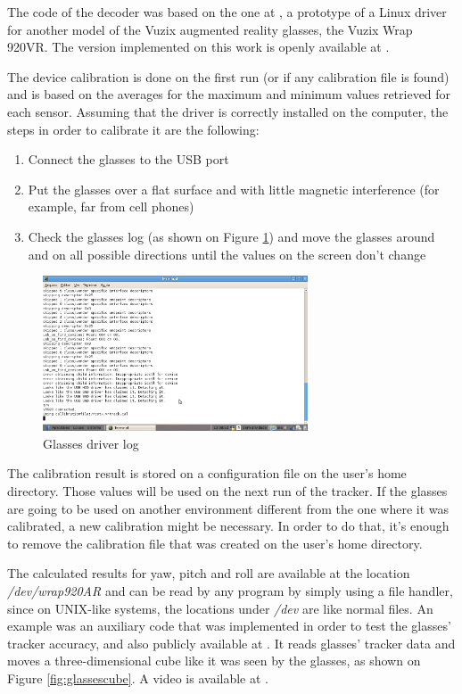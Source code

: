 \documentclass[msc, a4paper, classic, en]{ufbathesis}
\begin{document}
The code of the decoder was based on the one at \cite{vuzixdriver}, a prototype of a Linux driver for another model of the Vuzix augmented reality glasses, the Vuzix Wrap 920VR. The version implemented on this work is openly available at \cite{masterproject}.

The device calibration is done on the first run (or if any calibration file is found) and is based on the averages for the maximum and minimum values retrieved for each sensor. Assuming that the driver is correctly installed on the computer, the steps in order to calibrate it are the following:

\begin{enumerate}
  \item Connect the glasses to the USB port
  \item Put the glasses over a flat surface and with little magnetic interference (for example, far from cell phones)
  \item Check the glasses log (as shown on Figure \ref{fig:glasseslog}) and move the glasses around and on all possible directions until the values on the screen don't change
\end{enumerate}

\begin{figure}
\centering
\includegraphics[width=0.7\textwidth]{images/glasseslog.png}
\caption{Glasses driver log}
\label{fig:glasseslog}
\end{figure}

The calibration result is stored on a configuration file on the user's home directory. Those values will be used on the next run of the tracker. If the glasses are going to be used on another environment different from the one where it was calibrated, a new calibration might be necessary. In order to do that, it's enough to remove the calibration file that was created on the user's home directory.

The calculated results for yaw, pitch and roll are available at the location \textit{/dev/wrap920AR} and can be read by any program by simply using a file handler, since on UNIX-like systems, the locations under \textit{/dev} are like normal files. An example was an auxiliary code that was implemented in order to test the glasses' tracker accuracy, and also publicly available at \cite{masterproject}. It reads glasses' tracker data and moves a three-dimensional cube like it was seen by the glasses, as shown on Figure \ref{fig:glassescube}. A video is available at \cite{videos}.
\end{document}
